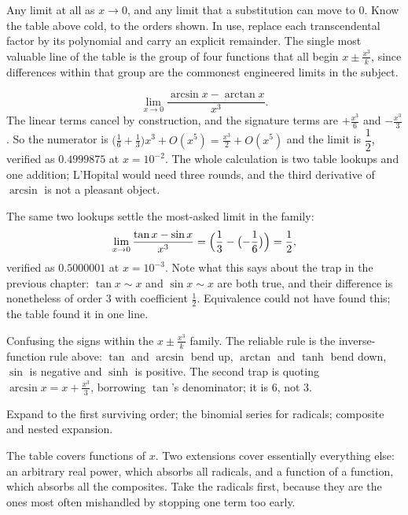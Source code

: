 \cue Any limit at all as $x\to0$, and any limit that a substitution can move to $0$.
\method Know the table above cold, to the orders shown. In use, replace each transcendental factor by its polynomial and carry an explicit remainder. The single most valuable line of the table is the group of four functions that all begin $x\pm\tfrac{x^{3}}{k}$, since differences within that group are the commonest engineered limits in the subject.

\begin{worked}
\[
\lim_{x\to0}\frac{\arcsin x-\arctan x}{x^{3}}.
\]
The linear terms cancel by construction, and the signature terms are $+\tfrac{x^{3}}{6}$ and $-\tfrac{x^{3}}{3}$. So the numerator is $\bigl(\tfrac16+\tfrac13\bigr)x^{3}+O(x^{5})=\tfrac{x^{3}}{2}+O(x^{5})$ and the limit is $\dfrac12$, verified as $0.4999875$ at $x=10^{-2}$. The whole calculation is two table lookups and one addition; L'Hopital would need three rounds, and the third derivative of $\arcsin$ is not a pleasant object.

The same two lookups settle the most-asked limit in the family:
\[
\lim_{x\to0}\frac{\tan x-\sin x}{x^{3}}=\Bigl(\frac13-\bigl(-\frac16\bigr)\Bigr)=\frac12 ,
\]
verified as $0.5000001$ at $x=10^{-3}$. Note what this says about the trap in the previous chapter: $\tan x\sim x$ and $\sin x\sim x$ are both true, and their difference is nonetheless of order $3$ with coefficient $\tfrac12$. Equivalence could not have found this; the table found it in one line.
\end{worked}

\begin{trap}
Confusing the signs within the $x\pm\tfrac{x^{3}}{k}$ family. The reliable rule is the inverse-function rule above: $\tan$ and $\arcsin$ bend up, $\arctan$ and $\tanh$ bend down, $\sin$ is negative and $\sinh$ is positive. The second trap is quoting $\arcsin x=x+\tfrac{x^{3}}{3}$, borrowing $\tan$'s denominator; it is $6$, not $3$.
\end{trap}

\begin{seealsob}Expand to the first surviving order; the binomial series for radicals; composite and nested expansion.\end{seealsob}

The table covers functions of $x$. Two extensions cover essentially everything else: an arbitrary real power, which absorbs all radicals, and a function of a function, which absorbs all the composites. Take the radicals first, because they are the ones most often mishandled by stopping one term too early.


